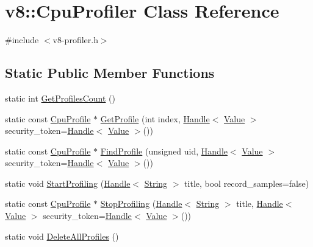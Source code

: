 \hypertarget{classv8_1_1_cpu_profiler}{}\section{v8\+:\+:Cpu\+Profiler Class Reference}
\label{classv8_1_1_cpu_profiler}


{\ttfamily \#include $<$v8-\/profiler.\+h$>$}

\subsection*{Static Public Member Functions}
\begin{DoxyCompactItemize}
\item 
static int \hyperlink{classv8_1_1_cpu_profiler_a44a4ffe2e95237dfeb892972d14d344e}{Get\+Profiles\+Count} ()
\item 
static const \hyperlink{classv8_1_1_cpu_profile}{Cpu\+Profile} $\ast$ \hyperlink{classv8_1_1_cpu_profiler_aca7acdfb0f9a4e7744638dddf97d5ada}{Get\+Profile} (int index, \hyperlink{classv8_1_1_handle}{Handle}$<$ \hyperlink{classv8_1_1_value}{Value} $>$ security\+\_\+token=\hyperlink{classv8_1_1_handle}{Handle}$<$ \hyperlink{classv8_1_1_value}{Value} $>$())
\item 
static const \hyperlink{classv8_1_1_cpu_profile}{Cpu\+Profile} $\ast$ \hyperlink{classv8_1_1_cpu_profiler_a8165ab53a0d9669757e64efd80d4f5d0}{Find\+Profile} (unsigned uid, \hyperlink{classv8_1_1_handle}{Handle}$<$ \hyperlink{classv8_1_1_value}{Value} $>$ security\+\_\+token=\hyperlink{classv8_1_1_handle}{Handle}$<$ \hyperlink{classv8_1_1_value}{Value} $>$())
\item 
static void \hyperlink{classv8_1_1_cpu_profiler_a27d41736bfad110459f8be26344814ea}{Start\+Profiling} (\hyperlink{classv8_1_1_handle}{Handle}$<$ \hyperlink{classv8_1_1_string}{String} $>$ title, bool record\+\_\+samples=false)
\item 
static const \hyperlink{classv8_1_1_cpu_profile}{Cpu\+Profile} $\ast$ \hyperlink{classv8_1_1_cpu_profiler_ac2702be592e9218e6584f562a9ad7dd8}{Stop\+Profiling} (\hyperlink{classv8_1_1_handle}{Handle}$<$ \hyperlink{classv8_1_1_string}{String} $>$ title, \hyperlink{classv8_1_1_handle}{Handle}$<$ \hyperlink{classv8_1_1_value}{Value} $>$ security\+\_\+token=\hyperlink{classv8_1_1_handle}{Handle}$<$ \hyperlink{classv8_1_1_value}{Value} $>$())
\item 
static void \hyperlink{classv8_1_1_cpu_profiler_a78bd6f781ff00c0ff1f88870608369c5}{Delete\+All\+Profiles} ()
\end{DoxyCompactItemize}


